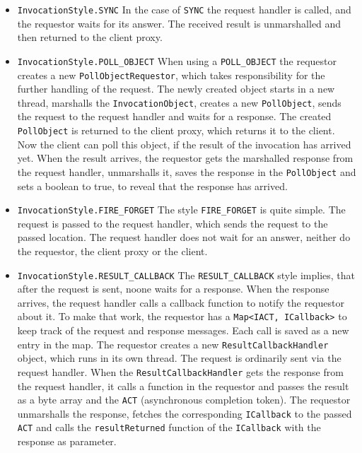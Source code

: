 \begin{itemize}
	\item \texttt{InvocationStyle.SYNC}
	In the case of \texttt{SYNC} the request handler is called, and the requestor waits for its answer. The received result is unmarshalled and then returned to the client proxy. 	
	\item \texttt{InvocationStyle.POLL\_OBJECT}
	When using a \texttt{POLL\_OBJECT} the requestor creates a new \texttt{PollObjectRequestor}, which takes responsibility for the further handling of the request. The newly created object starts in a new thread, marshalls the \texttt{InvocationObject}, creates a new \texttt{PollObject}, sends the request to the request handler and waits for a response. The created \texttt{PollObject} is returned to the client proxy, which returns it to the client. Now the client can poll this object, if the result of the invocation has arrived yet. When the result arrives, the requestor gets the marshalled response from the request handler, unmarshalls it, saves the response in the \texttt{PollObject} and sets a boolean to true, to reveal that the response has arrived.
	\item \texttt{InvocationStyle.FIRE\_FORGET}
	The style \texttt{FIRE\_FORGET} is quite simple. The request is passed to the request handler, which sends the request to the passed location. The request handler does not wait for an answer, neither do the requestor, the client proxy or the client.
	\item \texttt{InvocationStyle.RESULT\_CALLBACK}
	The \texttt{RESULT\_CALLBACK} style implies, that after the request is sent, noone waits for a response. When the response arrives, the request handler calls a callback function to notify the requestor about it. To make that work, the requestor has a \texttt{Map<IACT, ICallback>} to keep track of the request and response messages. Each call is saved as a new entry in the map. The requestor creates a new \texttt{ResultCallbackHandler} object, which runs in its own thread. The request is ordinarily sent via the request handler. When the \texttt{ResultCallbackHandler} gets the response from the request handler, it calls a function in the requestor and passes the result as a byte array and the \texttt{ACT} (asynchronous completion token). The requestor unmarshalls the response, fetches the corresponding \texttt{ICallback} to the passed \texttt{ACT} and calls the \texttt{resultReturned} function of the \texttt{ICallback} with the response as parameter.
\end{itemize}


